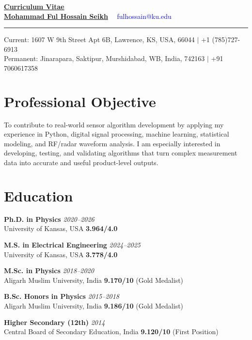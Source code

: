 \documentclass[10pt]{report}
\begin{document}
\begin{center}
    \href{https://github.com/Mohammad-Neutrino/CV}{\bf \huge Curriculum Vitae}\\[0.05cm]
    \href{https://physics.ku.edu/people/seikh-mohammad-ful-hossain}{\bf \large Mohammad Ful Hossain Seikh} ~~\textcolor{blue}{fulhossain@ku.edu}
    \rule{\textwidth}{0.4pt}
    Current: 1607 W 9th Street Apt 6B, Lawrence, KS, USA, 66044 $\vert$ +1 (785)727-6913 \\
    Permanent: Jinarapara, Saktipur, Murshidabad, WB, India, 742163 $\vert$ +91 7060617358
\end{center}

\section*{Professional Objective}
To contribute to real-world sensor algorithm development by applying my experience in Python, digital signal processing, machine learning, statistical modeling, and RF/radar waveform analysis. I am especially interested in developing, testing, and validating algorithms that turn complex measurement data into accurate and useful product-level outputs.

\section*{Education}

\noindent
\textbf{Ph.D. in Physics} \textit{2020--2026} \\
University of Kansas, USA \hfill \textbf{3.964/4.0}

\vspace{0em}
\noindent
\textbf{M.S. in Electrical Engineering}    \textit{2024--2025} \\
University of Kansas, USA \hfill \textbf{3.778/4.0}

\vspace{0em}
\noindent
\textbf{M.Sc. in Physics}  \textit{2018--2020} \\
Aligarh Muslim University, India \hfill \textbf{9.170/10} (Gold Medalist)

\vspace{0em}
\noindent
\textbf{B.Sc. Honors in Physics}  \textit{2015--2018} \\
Aligarh Muslim University, India \hfill \textbf{9.186/10} (Gold Medalist)

\vspace{0em}
\noindent
\textbf{Higher Secondary (12th)}  \textit{2014} \\
Central Board of Secondary Education, India \hfill \textbf{9.120/10} (First Position)
\end{document}
